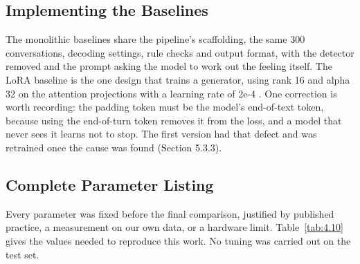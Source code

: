 \subsection{Implementing the Baselines}

The monolithic baselines share the pipeline's scaffolding, the same 300 conversations, decoding settings, rule checks and output format, with the detector removed and the prompt asking the model to work out the feeling itself. The LoRA baseline is the one design that trains a generator, using rank 16 and alpha 32 on the attention projections with a learning rate of 2e-4 \cite{hu2022lora}. One correction is worth recording: the padding token must be the model's end-of-text token, because using the end-of-turn token removes it from the loss, and a model that never sees it learns not to stop. The first version had that defect and was retrained once the cause was found (Section 5.3.3).

\subsection{Complete Parameter Listing}

Every parameter was fixed before the final comparison, justified by published practice, a measurement on our own data, or a hardware limit. Table~\ref{tab:4.10} gives the values needed to reproduce this work. No tuning was carried out on the test set.

